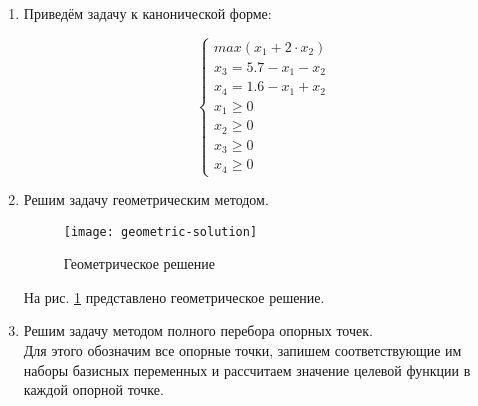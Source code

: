 \begin{enumerate}
	
\item Приведём задачу к канонической форме:

\begin{equation}
\begin{cases}
	max \left( x_1 + 2 \cdot x_2 \right)
	\\
	x_3 = 5.7 - x_1 - x_2
	\\
	x_4 = 1.6 - x_1 + x_2
	\\
	x_1 \geq 0
	\\
	x_2 \geq 0
	\\
	x_3 \geq 0	
	\\
	x_4 \geq 0
\end{cases}
\end{equation}	

\item Решим задачу геометрическим методом.

\begin{figure}[H]
\begin{center}
	\texttt{[image: geometric-solution]}
	\caption{Геометрическое решение}
	\label{pic:graphic-solution}
\end{center}
\end{figure}

На рис. \ref{pic:graphic-solution} представлено геометрическое решение.

\item Решим задачу методом полного перебора опорных точек.\\
\noindent Для этого обозначим все опорные точки, запишем соответствующие им наборы базисных переменных и рассчитаем значение целевой функции в каждой опорной точке.

\end{enumerate}

